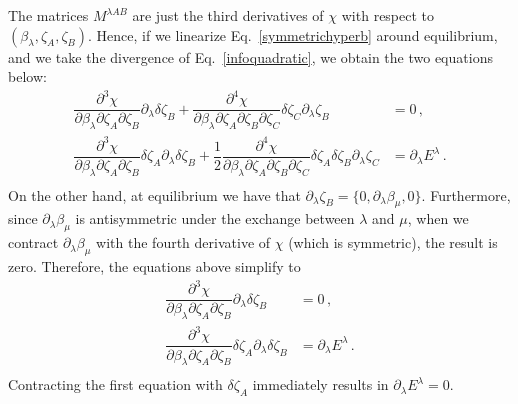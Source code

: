 \documentclass[12pt,aps,prd,nofootinbib,noshowkeys,noshowpacs,longbibliography,
superscriptaddress,tightenlines,floatfix,preprintnumbers]{revtex4-2}
\begin{document}
The matrices $M^{\lambda AB}$ are just the third derivatives of $\chi$ with respect to $(\beta_\lambda,\zeta_A, \zeta_B)$.  Hence, if we linearize Eq.~\eqref{symmetrichyperb} around equilibrium, and we take the divergence of Eq.~\eqref{infoquadratic}, we obtain the two equations below:
\begin{equation}
    \begin{split}
\dfrac{\partial^3 \chi}{\partial \beta_\lambda \partial \zeta_A \partial \zeta_B} \partial_\lambda \delta \zeta_B + \dfrac{\partial^4 \chi}{\partial \beta_\lambda \partial \zeta_A \partial \zeta_B \partial \zeta_C} \delta \zeta_C \partial_\lambda \zeta_B &= 0 \, , \\
\dfrac{\partial^3 \chi}{\partial \beta_\lambda \partial \zeta_A \partial \zeta_B} \delta \zeta_A \partial_\lambda \delta \zeta_B + \dfrac{1}{2} \dfrac{\partial^4 \chi}{\partial \beta_\lambda \partial \zeta_A \partial \zeta_B \partial \zeta_C} \delta \zeta_A \delta \zeta_B \partial_\lambda \zeta_C &= \partial_\lambda E^\lambda  \, .  \\
    \end{split}
\end{equation}
On the other hand, at equilibrium we have that $\partial_\lambda \zeta_B=\{0,\partial_\lambda \beta_\mu,0 \}$. Furthermore, since $\partial_\lambda \beta_\mu$ is antisymmetric  under the exchange between $\lambda$ and $\mu$, when we contract $\partial_\lambda \beta_\mu$ with the fourth derivative of $\chi$ (which is symmetric), the result is zero. Therefore, the equations above simplify to
\begin{equation}
    \begin{split}
\dfrac{\partial^3 \chi}{\partial \beta_\lambda \partial \zeta_A \partial \zeta_B} \partial_\lambda \delta \zeta_B  &= 0 \, , \\
\dfrac{\partial^3 \chi}{\partial \beta_\lambda \partial \zeta_A \partial \zeta_B} \delta \zeta_A \partial_\lambda \delta \zeta_B &= \partial_\lambda E^\lambda  \, .  \\
    \end{split}
\end{equation}
Contracting the first equation with $\delta \zeta_A$ immediately results in $\partial_\lambda E^\lambda =0$.
%


\end{document}
